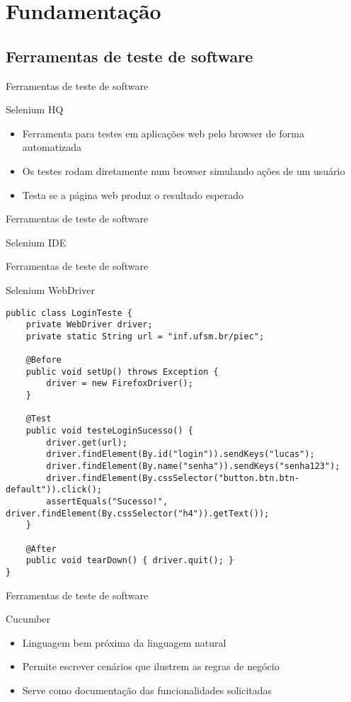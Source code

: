 \documentclass{beamer}
\begin{document}
\section{Fundamentação}
\subsection{Ferramentas de teste de software}
\begin{frame}{Ferramentas de teste de software}
    \item Selenium HQ
	\begin{itemize}
		\item Ferramenta para testes em aplicações web pelo browser de forma automatizada
        \item Os testes rodam diretamente num browser simulando ações de um usuário
        \item Testa se a página web produz o resultado esperado
	\end{itemize}
\end{frame}
\begin{frame}{Ferramentas de teste de software}
    \item Selenium IDE
    \begin{center}\end{center}
\end{frame}
\begin{frame}[fragile]{Ferramentas de teste de software}
    \item Selenium WebDriver
    \begin{lstlisting}
public class LoginTeste {
    private WebDriver driver;
    private static String url = "inf.ufsm.br/piec";
    
    @Before
    public void setUp() throws Exception { 
        driver = new FirefoxDriver(); 
    }
    
    @Test
    public void testeLoginSucesso() {
        driver.get(url);
        driver.findElement(By.id("login")).sendKeys("lucas");
        driver.findElement(By.name("senha")).sendKeys("senha123");
        driver.findElement(By.cssSelector("button.btn.btn-default")).click();
        assertEquals("Sucesso!", driver.findElement(By.cssSelector("h4")).getText());
    }
    
    @After
    public void tearDown() { driver.quit(); }
}
	\end{lstlisting}
\end{frame}
\begin{frame}[fragile]{Ferramentas de teste de software}
    \item Cucumber
	\begin{itemize}
		\item Linguagem bem próxima da linguagem natural
		\item Permite escrever cenários que ilustrem as regras de negócio
        \item Serve como documentação das funcionalidades solicitadas
	\end{itemize}
\end{frame}
\end{document}
